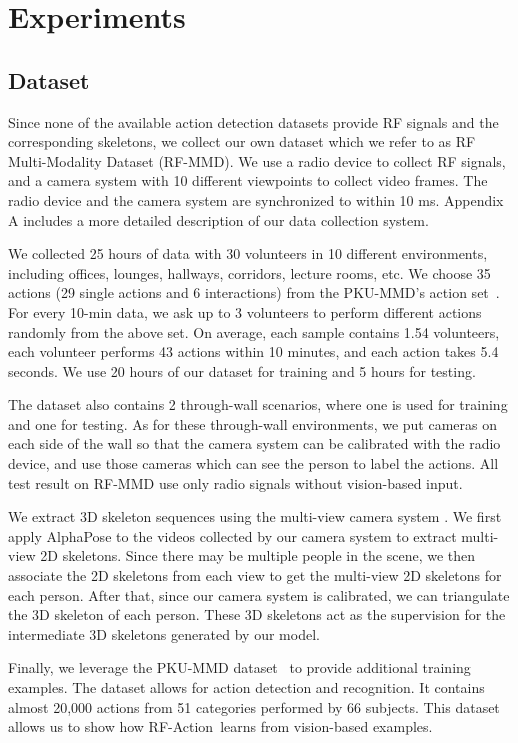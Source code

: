 \documentclass[10pt,twocolumn,letterpaper]{article}
\newcommand{\name} {RF-Action}
\begin{document}
\section{Experiments}

\subsection{Dataset}
Since none of the available action detection datasets provide RF signals and the corresponding skeletons, we collect our own dataset which we refer to as RF Multi-Modality Dataset (RF-MMD). We use a radio device to collect RF signals, and a camera system with 10 different viewpoints to collect video frames. The radio device and the camera system are synchronized to within 10 ms. Appendix A includes a more detailed description of our data collection system.

We collected 25 hours of data with 30 volunteers in 10 different environments, including offices, lounges, hallways, corridors, lecture rooms, etc. 
We choose 35 actions (29 single actions and 6 interactions) from the PKU-MMD's action set~\cite{liu2017pku}. For every 10-min data, we ask up to 3 volunteers to perform different actions randomly from the above set. On average, each sample contains 1.54 volunteers, each volunteer performs 43 actions within 10 minutes, and each action takes 5.4 seconds. We use 20 hours of our dataset for training and 5 hours for testing. 

The dataset also contains 2 through-wall scenarios, where one is used for training and one for testing. As for these through-wall environments, we put cameras on each side of the wall so that the camera system can be calibrated with the radio device, and use those cameras which can see the person to label the actions. All test result on RF-MMD use only radio signals without vision-based input.

We extract 3D skeleton sequences using the multi-view camera system \cite{zhao2018rf}.  We first apply AlphaPose \cite{fang2017rmpe} to the videos collected by our camera system to extract multi-view 2D skeletons. Since there may be multiple people in the scene, we then associate the 2D skeletons from each view to get the multi-view 2D skeletons for each person. After that, since our camera system is calibrated, we can triangulate the 3D skeleton of each person. These 3D skeletons act as the supervision for the intermediate 3D skeletons generated by our model.

Finally, we leverage the PKU-MMD dataset~\cite{liu2017pku} to provide additional training examples.  The dataset allows for action detection and recognition. It contains almost 20,000 actions from 51 categories performed by 66 subjects. This dataset allows us to show how \name\ learns from vision-based examples. 
 
\end{document}
